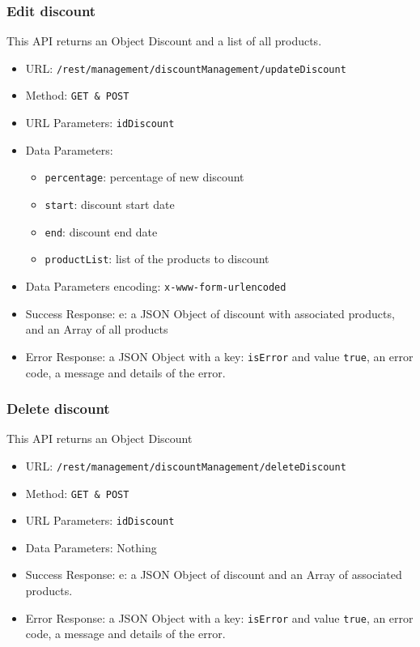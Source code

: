 \subsubsection*{Edit discount}
This API returns an Object Discount and a list of all products.

\begin{itemize}
    \item URL: \texttt{/rest/management/discountManagement/updateDiscount}
    \item Method: \texttt{{GET \& POST}}
    \item URL Parameters: \texttt{idDiscount}
    \item Data Parameters: 
    \begin{itemize}
        \item \texttt{percentage}: percentage of new discount
        \item \texttt{start}: discount start date
        \item \texttt{end}: discount end date
        \item \texttt{productList}: list of the products to discount
    \end{itemize}
    \item Data Parameters encoding: \texttt{x-www-form-urlencoded}
    \item Success Response: e: a JSON Object of discount with associated products, and an Array of all products
    \item Error Response: a JSON Object with a key: \texttt{isError}  and value \texttt{true}, an error code, a message and details of the error.
\end{itemize}

\subsubsection*{Delete discount}
This API returns an Object Discount

\begin{itemize}
    \item URL: \texttt{/rest/management/discountManagement/deleteDiscount}
    \item Method: \texttt{{GET \& POST}}
    \item URL Parameters: \texttt{idDiscount}
    \item Data Parameters: Nothing
    \item Success Response: e: a JSON Object of discount and an Array of associated products. 
    \item Error Response: a JSON Object with a key: \texttt{isError}  and value \texttt{true}, an error code, a message and details of the error.
\end{itemize}

